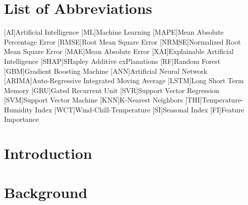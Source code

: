 \documentclass[a4paper,11pt]{report} %
\begin{document}
\chapter*{List of Abbreviations}
\begin{acronym}
     [AI]{Artificial Intelligence}
     [ML]{Machine Learning}
     [MAPE]{Mean Absolute Percentage Error}
     [RMSE]{Root Mean Square Error}
     [NRMSE]{Normalized Root Mean Square Error}
     [MAE]{Mean Absolute Error}
     [XAI]{Explainable Artificial Intelligence}
     [SHAP]{SHapley Additive exPlanations}
     [RF]{Random Forest}
     [GBM]{Gradient Boosting Machine}
     [ANN]{Artificial Neural Network}
     [ARIMA]{Auto-Regressive Integrated Moving Average}
     [LSTM]{Long Short Term Memory}
     [GRU]{Gated Recurrent Unit}
     [SVR]{Support Vector Regression}
     [SVM]{Support Vector Machine}
     [KNN]{K-Nearest Neighbors}
     [THI]{Temperature-Humidity Index}
     [WCT]{Wind-Chill-Temperature}
     [SI]{Seasonal Index}
     [FI]{Feature Importance}
\end{acronym}

\cleardoublepage

\pagestyle{fancy}
\setcounter{page}{1}

\chapter{Introduction}\label{cha:introduction}


\chapter{Background}\label{cha:background}


% 

% 
\end{document}
